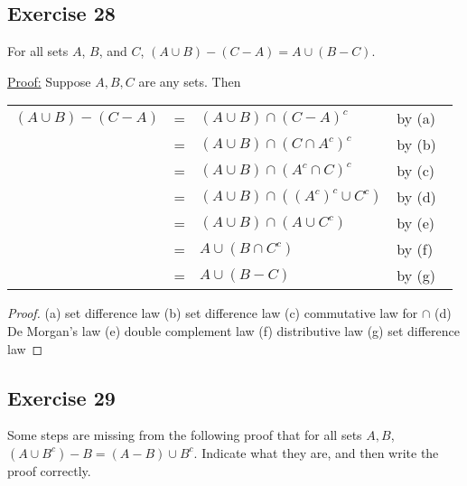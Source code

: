 \documentclass[14pt]{extarticle}
\newcommand{\fbl}{\underline{\hspace{1cm}}\,\,}
\begin{document}
\subsection{Exercise 28}
For all sets $A$, $B$, and $C$, \((A \cup B) - (C - A) = A \cup (B - C)\).

\underline{Proof:} Suppose $A,B,C$ are any sets. Then

\begin{tabular}{rcll}
  \((A \cup B) - (C - A)\) & = & \((A \cup B) \cap (C - A)^c\)        & by (a) \fbl \\
                           & = & \((A \cup B) \cap (C \cap A^c)^c\)   & by (b) \fbl \\
                           & = & \((A \cup B) \cap (A^c \cap C)^c\)   & by (c) \fbl \\
                           & = & \((A \cup B)\cap((A^c)^c \cup C^c)\) & by (d) \fbl \\
                           & = & \((A \cup B) \cap (A \cup C^c)\)     & by (e) \fbl \\
                           & = & \(A \cup (B \cap C^c)\)              & by (f) \fbl \\
                           & = & \(A \cup (B - C)\)                   & by (g) \fbl
\end{tabular}

\begin{proof}
  (a) set difference law (b) set difference law (c) commutative law for $\cap$ (d) De Morgan’s law
  (e) double complement law (f) distributive law (g) set difference law
\end{proof}

\subsection{Exercise 29}
Some steps are missing from the following proof that for all sets $A,B$, \((A \cup B^c) - B = (A - B) \cup B^c\).
Indicate what they are, and then write the proof correctly.
\end{document}
